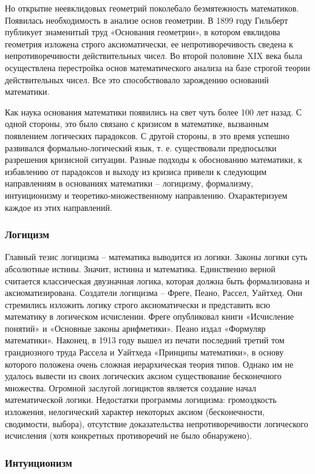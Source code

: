 Но открытие неевклидовых геометрий поколебало безмятежность математиков. Появилась необходимость в анализе основ геометрии. В 1899 году Гильберт публикует знаменитый труд «Основания геометрии», в котором евклидова геометрия изложена строго аксиоматически, ее непротиворечивость сведена к непротиворечивости действительных чисел. Во второй половине XIX века была осуществлена перестройка основ математического анализа на базе строгой теории действительных чисел. Все это способствовало зарождению оснований математики. 

Как наука основания математики появились на свет чуть более 100 лет назад. С одной стороны, это было связано с кризисом в математике, вызванным появлением логических парадоксов. С другой стороны, в это время успешно развивался формально-логический язык, т. е. существовали предпосылки разрешения кризисной ситуации. Разные подходы к обоснованию математики, к избавлению от парадоксов и выходу из кризиса привели к следующим направлениям в основаниях математики – логицизму, формализму, интуиционизму и теоретико-множественному направлению. Охарактеризуем каждое из этих направлений.

\subsubsection{Логицизм}

Главный тезис логицизма – математика выводится из логики. Законы логики суть абсолютные истины. Значит, истинна и математика. Единственно верной считается классическая двузначная логика, которая должна быть формализована и аксиоматизирована. Создатели логицизма – Фреге, Пеано, Рассел, Уайтхед. Они стремились изложить логику строго аксиоматически и представить всю математику в логическом исчислении. Фреге опубликовал книги «Исчисление понятий» и «Основные законы арифметики». Пеано издал «Формуляр математики». Наконец, в 1913 году вышел из печати последний третий том грандиозного труда Рассела и Уайтхеда «Принципы математики», в основу которого положена очень сложная иерархическая теория типов. Однако им не удалось вывести из своих логических аксиом существование бесконечного множества. Огромной заслугой логицистов является создание начал математической логики. Недостатки программы логицизма: громоздкость изложения, нелогический характер некоторых аксиом (бесконечности, сводимости, выбора), отсутствие доказательства непротиворечивости логического исчисления (хотя конкретных противоречий не было обнаружено).

\subsubsection{Интуиционизм}

